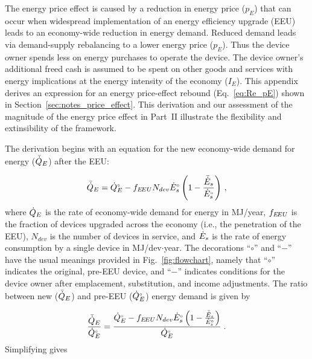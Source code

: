 

The energy price effect is caused by a reduction 
in energy price ($p_E$)
that can occur when widespread implementation 
of an energy efficiency upgrade (EEU)
leads to an economy-wide reduction in energy demand.
Reduced demand leads via demand-supply rebalancing to a lower energy price ($p_E$).
Thus the device owner spends less on energy purchases
to operate the device.
The device owner's additional freed cash
is assumed to be spent on other goods and services
with energy implications 
at the energy intensity of the economy ($I_E$).
This appendix derives an expression for an
energy price-effect rebound (Eq.~\ref{eq:Re_pE})
shown in Section~\ref{sec:notes_price_effect}.
This derivation and our assessment of the magnitude of the energy price effect
in Part~II
illustrate the flexibility and extinsibility of the framework.

The derivation begins with an equation for the new economy-wide 
demand for energy ($\bar{\dot{Q}}_E$) after the EEU:

\begin{equation}
  \bar{\dot{Q}}_E = {}{\dot{Q}}^{\scriptscriptstyle \circ}_E - f_{E\!EU} N_{dev} {}{\dot{E}}^{\scriptscriptstyle \circ}_s \left( 1 - \frac{\bar{\dot{E}}_s}{{}{\dot{E}}^{\scriptscriptstyle \circ}_s} \right) \, ,
\end{equation}
%
where
$\dot{Q}_E$ is the rate of economy-wide demand for energy in MJ/year,
$f_{E\!EU}$ is the fraction of devices upgraded across the economy
(i.e., the penetration of the EEU),
$N_{dev}$ is the number of devices in service, and
$\dot{E}_s$ is the rate of energy consumption by a single device in MJ/dev$\cdot$year.
The decorations ``$\circ$'' and ``$-$'' have the usual meanings
provided in Fig.~\ref{fig:flowchart}, namely that
``$\circ$'' indicates the original, pre-EEU device, and
``$-$'' indicates conditions for the device owner after
emplacement, substitution, and income
adjustments.
The ratio between
new ($\bar{\dot{Q}}_E$) and
pre-EEU (${}{\dot{Q}}^{\scriptscriptstyle \circ}_E$)
energy demand is given by

\begin{equation}
  \frac{\bar{\dot{Q}}_E}{{}{\dot{Q}}^{\scriptscriptstyle \circ}_E} =
        \frac{{}{\dot{Q}}^{\scriptscriptstyle \circ}_E - f_{E\!EU} N_{dev} {}{\dot{E}}^{\scriptscriptstyle \circ}_s \left( 1 - \frac{\bar{\dot{E}}_s}{{}{\dot{E}}^{\scriptscriptstyle \circ}_s}  \right)}
        {{}{\dot{Q}}^{\scriptscriptstyle \circ}_E} \; .
\end{equation}
%
Simplifying gives

